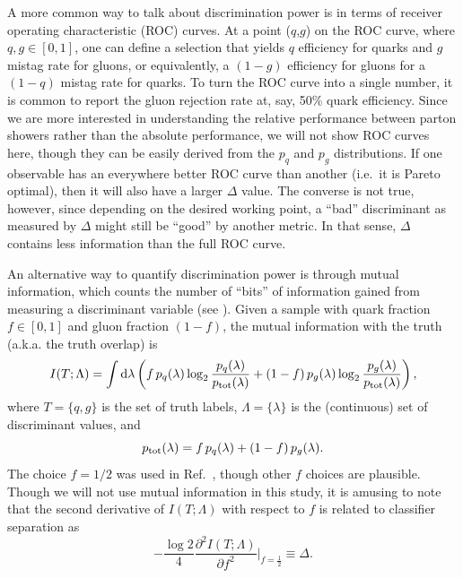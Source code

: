 \documentclass[11pt]{cernrep}
\begin{document}
A more common way to talk about discrimination power is in terms of receiver operating characteristic (ROC) curves.  At a point ($q$,$g$) on the ROC curve, where $q,g \in [0,1]$, one can define a selection that yields $q$ efficiency for quarks and $g$ mistag rate for gluons, or equivalently, a $(1-g)$ efficiency for gluons for a $(1-q)$ mistag rate for quarks.  To turn the ROC curve into a single number, it is common to report the gluon rejection rate at, say, 50\% quark efficiency.  Since we are more interested in understanding the relative performance between parton showers rather than the absolute performance, we will not show ROC curves here, though they can be easily derived from the $p_q$ and $p_g$ distributions.  If one observable has an everywhere better ROC curve than another (i.e.~it is Pareto optimal), then it will also have a larger $\Delta$ value.  The converse is not true, however, since depending on the desired working point, a ``bad'' discriminant as measured by $\Delta$ might still be ``good'' by another metric.  In that sense, $\Delta$ contains less information than the full ROC curve.

An alternative way to quantify discrimination power is through mutual information, which counts the number of ``bits'' of information gained from measuring a discriminant variable (see \cite{Larkoski:2014pca}).  Given a sample with quark fraction $f \in [0,1]$ and gluon fraction $(1-f)$, the mutual information with the truth (a.k.a. the truth overlap) is
\begin{equation}
I(T; \Lambda) = \int \text{d} \lambda \left(f \, p_q(\lambda) \log_2 \frac{p_q(\lambda)}{p_{\rm tot}(\lambda)} + (1-f) \, p_g(\lambda) \log_2 \frac{p_g(\lambda)}{p_{\rm tot}(\lambda)}   \right),
\end{equation}
where $T = \{q,g\}$ is the set of truth labels, $\Lambda = \{\lambda\}$ is the (continuous) set of discriminant values, and 
\begin{equation}
p_{\rm tot}(\lambda) = f \, p_q(\lambda) + (1-f) \, p_g(\lambda).
\end{equation}
The choice $f = 1/2$ was used in Ref.~\cite{Larkoski:2014pca}, though other $f$ choices are plausible.  Though we will not use mutual information in this study, it is amusing to note that the second derivative of $I(T;\Lambda)$ with respect to $f$ is related to classifier separation as
\begin{equation}
\label{quarkgluon_eq:altdeltadef}
- \frac{\log 2}{4} \frac{\partial^2 I(T;\Lambda)}{\partial f^2} \Big|_{f = \frac{1}{2}} \equiv \Delta.
\end{equation}
\end{document}
